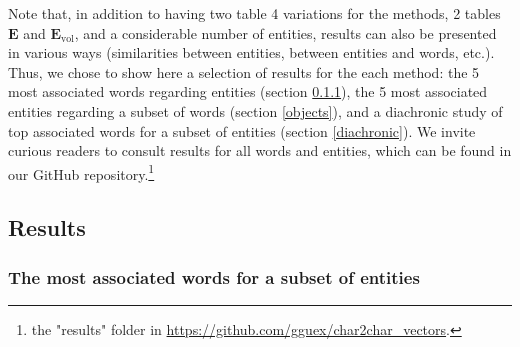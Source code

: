 \documentclass[
twocolumn,
]{ceurart}
\begin{document}
Note that, in addition to having two table 4 variations for the methods, 2 tables $\mathbf{E}$ and $\mathbf{E}_\text{vol}$, and a considerable number of entities, results can also be presented in various ways (similarities between entities, between entities and words, etc.). Thus, we chose to show here a selection of results for the each method: the 5 most associated words regarding entities (section \ref{words}), the 5 most associated entities regarding a subset of words (section \ref{objects}), and a diachronic study of top associated words for a subset of entities (section \ref{diachronic}). We invite curious readers to consult results for all words and entities, which can be found in our GitHub repository.\footnote{the "results" folder in \url{https://github.com/gguex/char2char_vectors}.}

\subsection{Results}

\subsubsection{The most associated words for a subset of entities}
\label{words}

\end{document}
